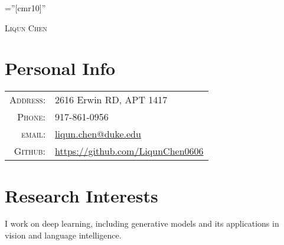 \documentclass[a4paper,10pt]{article}
\begin{document}

\pagestyle{empty} %

\font\fb=''[cmr10]'' %

\par{\centering
		{\Huge \textsc{Liqun Chen}
	}\bigskip\par}

\section{Personal Info}

\begin{tabular}{rl}
    \textsc{Address:}   & 2616 Erwin RD, APT 1417 \\
    \textsc{Phone:}     & 917-861-0956\\
    \textsc{email:}     & \href{mailto:liqun.chen@duke.edu}{liqun.chen@duke.edu}\\
    \textsc{Github:}    & \href{https://github.com/LiqunChen0606}{https://github.com/LiqunChen0606}
\end{tabular}

\section{Research Interests}
\small I work on deep learning, including generative models and its applications in vision and language intelligence.
\end{document}
